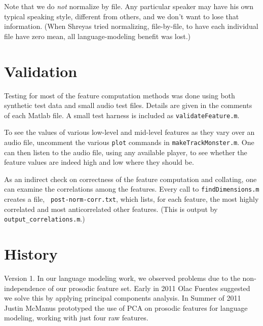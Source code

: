 \documentclass[11pt]{article}
\begin{document}
Note that we do {\em not} normalize by file.  Any particular speaker
may have his own typical speaking style, different from others, and we
don't want to lose that information.  (When Shreyas tried normalizing,
file-by-file, to have each individual file have zero mean, all
language-modeling benefit was lost.)



\section{Validation}

Testing for most of the feature computation methods was done using
both synthetic test data and small audio test files.  Details are
given in the comments of each Matlab file.  A small test harness is
included as {\tt validateFeature.m}.

To see the values of various low-level and mid-level features as they
vary over an audio file, uncomment the various {\tt plot} commands in
{\tt makeTrackMonster.m}.  One can then listen to the audio file,
using any available player, to see whether the feature values are
indeed high and low where they should be.

As an indirect check on correctness of the feature computation and
collating, one can examine the correlations among the features.  Every
call to {\tt findDimensions.m} creates a file, {\tt
  post-norm-corr.txt}, which lists, for each feature, the most highly
correlated and most anticorrelated other features.  (This is output by
{\tt output\_correlations.m}.)


\section{History}

Version 1.  In our language  modeling work, we observed
problems due to the non-independence of our prosodic feature set.
Early in 2011 Olac Fuentes suggested we solve this by applying
principal components analysis.  In Summer of 2011 Justin McManus
prototyped the use of PCA on prosodic features for language modeling,
working with just four raw features.
\end{document}
